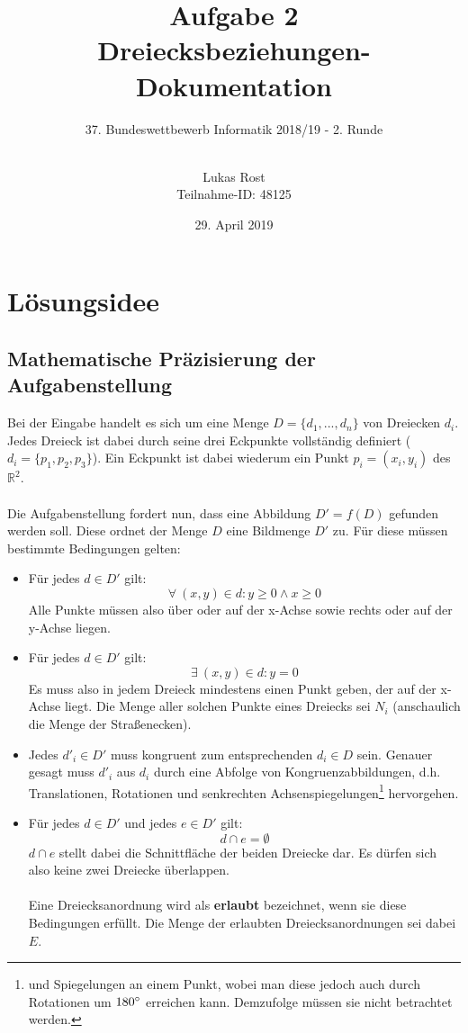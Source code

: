 \documentclass[a4paper, notitlepage, 12pt]{scrartcl}
\author{Lukas Rost \\ \small{Teilnahme-ID: 48125}}
\title{Aufgabe 2 \\ \glqq Dreiecksbeziehungen\grqq  - Dokumentation}
\subtitle{37. Bundeswettbewerb Informatik 2018/19 - 2. Runde \\~\\}
\date{29. April 2019}
\begin{document}
\renewcommand{\contentsname}{\centerline{Inhaltsverzeichnis}}
 \maketitle
 \tableofcontents
 \thispagestyle{empty}
 \newpage
 \setcounter{page}{1}
 
 \section{Lösungsidee}
 \subsection{Mathematische Präzisierung der Aufgabenstellung}
 Bei der Eingabe handelt es sich um eine Menge $D = \{d_1,...,d_n\}$ von Dreiecken $d_i$. Jedes Dreieck ist dabei durch seine drei Eckpunkte vollständig definiert ($d_i = \{p_1,p_2,p_3\}$). Ein Eckpunkt ist dabei wiederum ein Punkt $p_i = (x_i,y_i)$ des $\mathbb{R}^2$. \\ \\
 Die Aufgabenstellung fordert nun, dass eine Abbildung $D' = f(D)$ gefunden werden soll. Diese ordnet der Menge $D$ eine Bildmenge $D'$ zu. Für diese müssen bestimmte Bedingungen gelten:
 \begin{itemize}
 	\item Für jedes $d \in D'$ gilt:
 	\begin{equation}
 	\forall ~(x,y) \in d: y \geq 0 \wedge x \geq 0
 	\end{equation}
 	Alle Punkte müssen also über oder auf der x-Achse sowie rechts oder auf der y-Achse liegen.
 	\item Für jedes $d \in D'$ gilt:
 	\begin{equation}
 	\exists ~(x,y) \in d: y = 0
 	\end{equation}
 	Es muss also in jedem Dreieck mindestens einen Punkt geben, der auf der x-Achse liegt. Die Menge aller solchen Punkte eines Dreiecks sei $N_i$ (anschaulich die Menge der Straßenecken). 	
 	\item Jedes $d'_i \in D'$ muss kongruent zum entsprechenden $d_i \in D$ sein. Genauer gesagt muss $d'_i$ aus $d_i$ durch eine Abfolge von Kongruenzabbildungen, d.h. Translationen, Rotationen und senkrechten Achsenspiegelungen\footnote{ und Spiegelungen an einem Punkt, wobei man diese jedoch auch durch Rotationen um $180\degree$ erreichen kann. Demzufolge müssen sie nicht betrachtet werden.} hervorgehen.
 	\item Für jedes $d \in D'$ und jedes $e \in D'$ gilt:
 	\begin{equation}
 	d \cap e = \emptyset
 	\end{equation}
 	$d \cap e$ stellt dabei die Schnittfläche der beiden Dreiecke dar. Es dürfen sich also keine zwei Dreiecke überlappen.\\ \\
 	Eine Dreiecksanordnung wird als \textbf{erlaubt} bezeichnet, wenn sie diese Bedingungen erfüllt. Die Menge der erlaubten Dreiecksanordnungen sei dabei $E$.
  \end{itemize}
\end{document}
